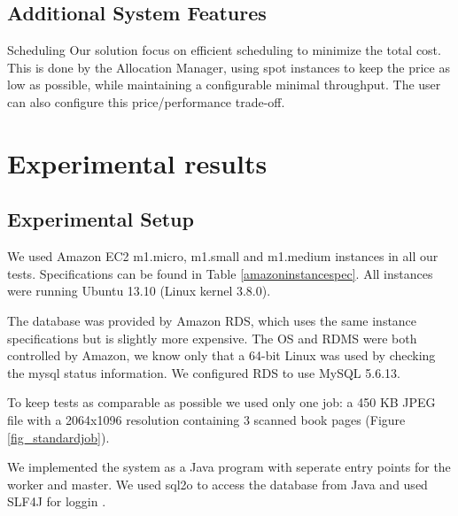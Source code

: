 \documentclass[a4paper]{IEEEtran}
\begin{document}
\subsection*{Additional System Features}

\begin{LaTeXdescription}
\item[Scheduling]
Our solution focus on efficient scheduling to minimize the total cost. This is done by the Allocation Manager, using spot instances to keep the price as low as possible, while maintaining a configurable minimal throughput.
The user can also configure this price/performance trade-off.

\end{LaTeXdescription}

\section{Experimental results}
\label{sec:experimentalresults}

\subsection{Experimental Setup}

We used Amazon EC2 m1.micro, m1.small and m1.medium instances in all our tests. Specifications can be found in Table \ref{amazoninstancespec}. All instances were running Ubuntu 13.10 (Linux kernel 3.8.0).

The database was provided by Amazon RDS, which uses the same instance specifications but is slightly more expensive. The OS and RDMS were both controlled by Amazon, we know only that a 64-bit Linux was used by checking the mysql status information. We configured RDS to use MySQL 5.6.13.

To keep tests as comparable as possible we used only one job: a 450 KB JPEG file with a 2064x1096 resolution containing 3 scanned book pages (Figure \ref{fig_standardjob}).

We implemented the system as a Java program with seperate entry points for the worker and master. We used sql2o \cite{sql2ocite} to access the database from Java and used SLF4J for loggin \cite{slf4jcite}.
\end{document}
